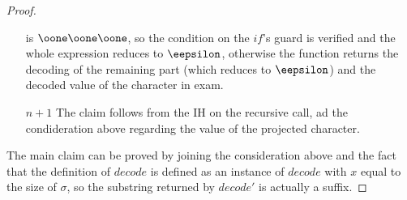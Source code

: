 \begin{conditional}{\notappendix}
\begin{proof}
\begin{itemize}
        is $\oone\oone\oone$, so the condition on the $\mathit{if}$'s guard
        is verified and the whole expression reduces to $\eepsilon$, otherwise
        the function returns the decoding of the remaining part (which reduces
        to $\eepsilon$) and the decoded value of the character in exam.
        \item[$n+1$] The claim follows from the IH on the
        recursive call, ad the condideration above regarding the value of the
        projected character.
      \end{itemize}
    The main claim can be proved by joining the consideration above and the fact
    that the definition of $\mathit{decode}$ is defined as an instance of
    $\mathit{decode}$ with $x$ equal to the size of $\sigma$, so the substring
    returned by $\mathit{decode}'$ is actually a suffix.
    \end{proof}


\end{conditional}
